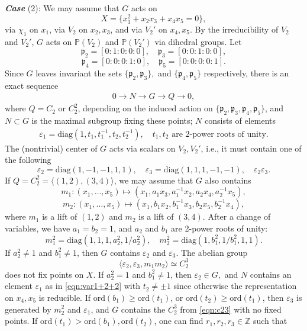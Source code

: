 \documentclass[12pt,reqno]{amsart}
\theoremstyle{plain}
\theoremstyle{remark}
\theoremstyle{definition}
\numberwithin{equation}{section}
\def\bP{{\mathbb P}}
\def\bZ{{\mathbb Z}}
\begin{document}
 
{\bf\em Case} (2): We may assume that $G$ acts on 
$$
X=\{x_1^2+x_2x_3+x_4x_5=0\},
$$
via $\chi_1$ on $x_1$, via $V_2$ on $x_2,x_3$, and via $V_2'$ on $x_4,x_5$. By the irreducibility of $V_2$ and $V_2'$, $G$ acts on $\bP(V_2)$ and $\bP(V_2')$ via dihedral groups. 
Let
$$
\mathfrak p_2=[0:1:0:0:0],\quad \mathfrak p_3=[0:0:1:0:0],
$$
$$
\mathfrak p_4=[0:0:0:1:0],\quad \mathfrak p_5=[0:0:0:0:1].
$$
Since $G$ leaves invariant the sets $\{\mathfrak p_2,\mathfrak p_3\},$ and $\{\mathfrak p_4,\mathfrak p_5\}$ respectively, there is an exact sequence
\begin{align}\label{eqn:exactseq1+2+2}
    0\to N\to G\to Q\to 0,
\end{align}
where $Q=C_2$ or $C_2^2$, depending on the induced action on $\{ \mathfrak p_2,\mathfrak p_3,\mathfrak p_4,\mathfrak p_5\}$, and $N\subset G$ is the maximal subgroup fixing these points; $N$ consists of elements 
\begin{align}\label{eqn:var1+2+2}
    \varepsilon_1=\mathrm{diag}(1,t_1,t_1^{-1},t_2,t_2^{-1}),\quad t_1, t_2\text{ are $2$-power roots of unity.}
\end{align}
The (nontrivial) center of $G$ acts via scalars on $V_2,V_2'$, i.e., it must contain 
one of the following 
$$
\varepsilon_2=\mathrm{diag}(1,-1,-1,1,1), \quad \varepsilon_3=\mathrm{diag}(1,1,1,-1,-1),\quad \varepsilon_2\varepsilon_3.
$$
If $Q=C_2^2=\langle(1,2),(3,4)\rangle$, we may assume that $G$ also contains 
$$
m_1: (x_1,\ldots,x_5)\mapsto(x_1,a_1x_3,a_1^{-1}x_2,a_2x_4,a_2^{-1}x_5),
$$
$$
m_2: (x_1,\ldots,x_5)\mapsto(x_1,b_1x_2,b_1^{-1}x_3,b_2x_5,b_2^{-1}x_4),
$$
where $m_1$ is a lift of $(1,2)$ and $m_2$ is a lift of $(3,4)$.
After a change of variables, we have $a_1=b_2=1$, and $a_2$ and $b_1$ are 
2-power roots of unity: 
$$
m_1^2=\mathrm{diag}(1,1,1,a_2^2,1/a_2^2),
\quad
m_2^2=\mathrm{diag}(1,b_1^2,1/b_1^2,1,1).
$$
If $a_2^2\ne1$ and $b_1^2\ne1$, then $G$ contains $\varepsilon_2$ and $\varepsilon_3$. The abelian group 
\begin{equation} 
\label{eqn:c23}
\langle\varepsilon_2,\varepsilon_3,m_1m_2\rangle\simeq C_2^3
\end{equation}
does not fix points on $X$. If $a_2^2=1$ and $b_1^2\ne1$, then $\varepsilon_2\in G,$ and $N$ contains an element $\varepsilon_1$ as in \eqref{eqn:var1+2+2} with $t_2\ne\pm1$ since otherwise the representation  on $x_4,x_5$ is reducible. If $\mathrm{ord}(b_1)\ge \mathrm{ord}(t_1)$, or $\mathrm{ord}(t_2)\geq \mathrm{ord}(t_1)$, then $\varepsilon_3$ is generated by $m_2^2$ and $\varepsilon_1$, and $G$ contains the $C_2^3$ from \eqref{eqn:c23} with no fixed points. If $\mathrm{ord}(t_1)>\mathrm{ord}(b_1), \mathrm{ord}(t_2)$, one can find $r_1,r_2,r_3\in \bZ$ such that
\end{document}
